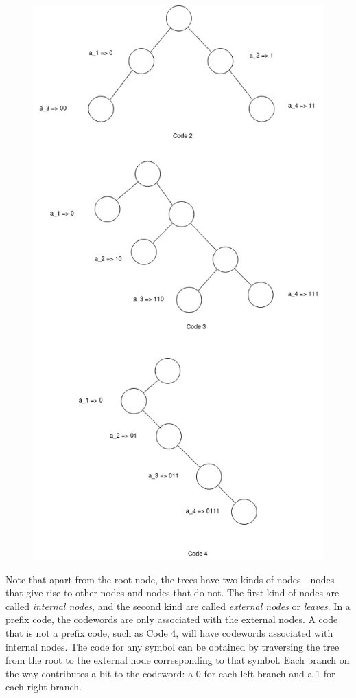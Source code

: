 \begin{figure}[H]
    \centering
    \includegraphics[scale=0.4]{images/2021-04-14-tree.png}
\end{figure}

Note that apart from the root node, the trees have two kinds of nodes—nodes that give rise to other nodes and nodes that do not. The first kind of nodes are called \emph{internal nodes}, and the second kind are called \emph{external nodes} or \emph{leaves}. In a prefix code, the codewords are only associated with the external nodes. A code that is not a prefix code, such as Code 4, will have codewords associated with internal nodes. The code for any symbol can be obtained by traversing the tree from the root to the external node corresponding to that symbol. Each branch on the way contributes a bit to the codeword: a 0 for each left branch and a 1 for each right branch.

